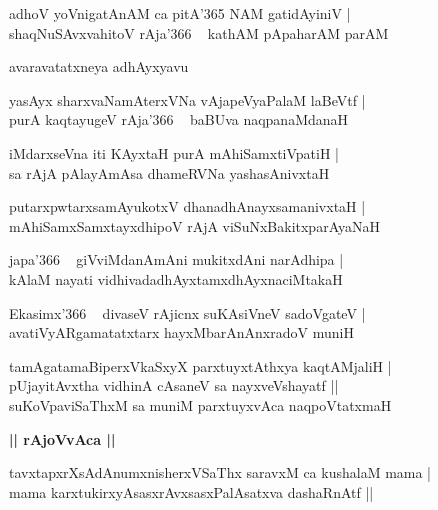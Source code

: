 \documentclass[twoside,12pt,openright]{book}
\newcounter{shloka}[chapter]
\def\uvaca#1{\centerline{{\large\textbf{#1}}}}
\begin{document}
\begin{shloka}%
adhoV yoVnigatAnAM ca pitA\char'365 NAM gatidAyiniV |\\
shaqNuSAvxvahitoV rAja\char'366 ~ kathAM pApaharAM parAM
\end{shloka}

\begin{center}
avaravatatxneya adhAyxyavu
\end{center}

\begin{shloka}%
yasAyx sharxvaNamAterxVNa vAjapeVyaPalaM laBeVtf |\\
purA kaqtayugeV rAja\char'366 ~ baBUva naqpanaMdanaH 
\end{shloka}

\begin{shloka}%
iMdarxseVna iti KAyxtaH purA mAhiSamxtiVpatiH |\\
sa rAjA pAlayAmAsa dhameRVNa yashasAnivxtaH 
\end{shloka}

\begin{shloka}%
putarxpwtarxsamAyukotxV dhanadhAnayxsamanivxtaH |\\
mAhiSamxSamxtayxdhipoV rAjA viSuNxBakitxparAyaNaH 
\end{shloka}

\begin{shloka}%
japa\char'366 ~ giVviMdanAmAni mukitxdAni narAdhipa |\\
kAlaM nayati vidhivadadhAyxtamxdhAyxnaciMtakaH 
\end{shloka}

\begin{shloka}%
Ekasimx\char'366 ~ divaseV rAjicnx suKAsiVneV sadoVgateV |\\
avatiVyARgamatatxtarx hayxMbarAnAnxradoV muniH
\end{shloka}

\begin{shloka}%
tamAgatamaBiperxVkaSxyX parxtuyxtAthxya kaqtAMjaliH |\\
pUjayitAvxtha vidhinA cAsaneV sa nayxveVshayatf ||\\
suKoVpaviSaThxM sa muniM parxtuyxvAca naqpoVtatxmaH
\end{shloka}

\uvaca{|| rAjoVvAca ||}

\begin{shloka}%
tavxtapxrXsAdAnumxnisherxVSaThx saravxM ca kushalaM mama |\\
mama karxtukirxyAsasxrAvxsasxPalAsatxva dashaRnAtf ||
\end{shloka}
\end{document}
